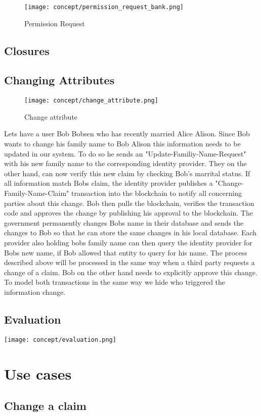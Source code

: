 \begin{figure}
\centering
\texttt{[image: concept/permission\_request\_bank.png]}
\caption{Permission Request}
\label{fig:permission_request}
\end{figure}

\subsection{Closures}
\begin{comment}
\begin{figure}
\centering
\texttt{[image: concept/closure.png]}
\caption{Closure}
\label{fig:closure}
\end{figure}
\end{comment}

\subsection{Changing Attributes}

\begin{figure}
\centering
\texttt{[image: concept/change\_attribute.png]}
\caption{Change attribute}
\label{fig:change_attribute}
\end{figure}


Lets have a user Bob Bobsen who has recently married Alice Alison. Since Bob wants to change his family name to Bob Alison this information needs to be updated in our system. To do so he sends an "Update-Familiy-Name-Request" with his new family name to the corresponding identity provider. They on the other hand, can now verify this new claim by checking Bob's marrital status. If all information match Bobs claim, the identity provider publishes a "Change-Family-Name-Claim" transaction into the blockchain to notify all concerning parties about this change. 
Bob then pulls the blockchain, verifies the transaction code and approves the change by publishing his approval to the blockchain. The government permanently changes Bobs name in their database and sends the changes to Bob so that he can store the same changes in his local database. 
Each provider also holding bobs family name can then query the identity provider for Bobs new name, if Bob allowed that entity to query for his name.
The process described above will be processed in the same way when a third party requests a change of a claim. Bob on the other hand needs to explicitly approve this change. To model both transactions in the same way we hide who triggered the information change.

\subsection{Evaluation}

\texttt{[image: concept/evaluation.png]}
 
\section{Use cases}

\subsection{Change a claim}
